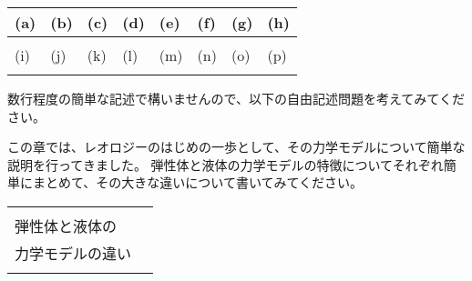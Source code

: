 \documentclass[uplatex,dvipdfmx,a4paper,11pt]{jsarticle}
\begin{document}
\begin{qparts}
\begin{table}[htb]
\begin{center}
      \begin{tabular}{|p{}|p{}|p{}|p{}|p{}|p{}|p{}|p{}|} \hline
        (a) & (b) & (c) & (d) & (e) & (f) & (g) & (h)\\ \hline
          &  & & & & & &  \\ \hline		
          (i) & (j) & (k) & (l) & (m) & (n) & (o) & (p)\\ \hline
          &  & & & & & &  \\ \hline		
      \end{tabular}
    \end{center}
  \end{table}

\end{qparts}

\clearpage
{}
数行程度の簡単な記述で構いませんので、以下の自由記述問題を考えてみてください。
\begin{qlist}
\qitem この章では、レオロジーのはじめの一歩として、その力学モデルについて簡単な説明を行ってきました。
弾性体と液体の力学モデルの特徴についてそれぞれ簡単にまとめて、その大きな違いについて書いてみてください。
\end{qlist}


\vspace{-5mm}
\begin{table}[htb]
  \begin{center} 
    \begin{tabular}{|l|p{}|} \hline
      & \\
      弾性体と液体の  & \\
      力学モデルの違い  & \\ 
      & \\ \hline
    \end{tabular}
  \end{center}
\end{table}
\end{document}
